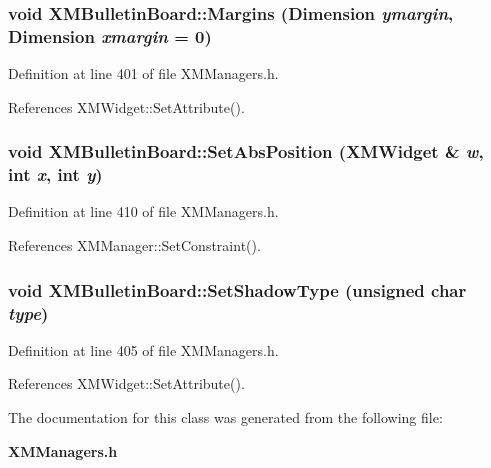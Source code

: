 \subsubsection{\setlength{\rightskip}{0pt plus 5cm}void XMBulletin\-Board::Margins (Dimension {\em ymargin}, Dimension {\em xmargin} = 0)\hspace{0.3cm}{\tt  [inline]}}\label{classXMBulletinBoard_a6}




Definition at line 401 of file XMManagers.h.

References XMWidget::Set\-Attribute().
\subsubsection{\setlength{\rightskip}{0pt plus 5cm}void XMBulletin\-Board::Set\-Abs\-Position ({\bf XMWidget} \& {\em w}, int {\em x}, int {\em y})\hspace{0.3cm}{\tt  [inline]}}\label{classXMBulletinBoard_a8}




Definition at line 410 of file XMManagers.h.

References XMManager::Set\-Constraint().
\subsubsection{\setlength{\rightskip}{0pt plus 5cm}void XMBulletin\-Board::Set\-Shadow\-Type (unsigned char {\em type})\hspace{0.3cm}{\tt  [inline]}}\label{classXMBulletinBoard_a7}




Definition at line 405 of file XMManagers.h.

References XMWidget::Set\-Attribute().

The documentation for this class was generated from the following file:\begin{CompactItemize}
\item 
{\bf XMManagers.h}\end{CompactItemize}
